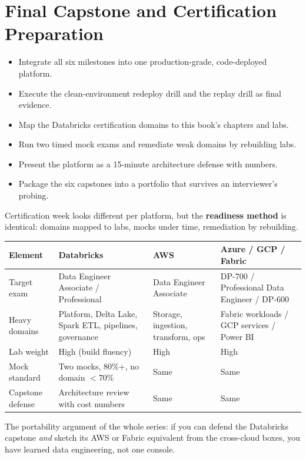 \chapter{Final Capstone and Certification Preparation}
%
%
\begin{objectives}
\begin{itemize}
    \item Integrate all six milestones into one production-grade, code-deployed platform.
    \item Execute the clean-environment redeploy drill and the replay drill as final evidence.
    \item Map the Databricks certification domains to this book's chapters and labs.
    \item Run two timed mock exams and remediate weak domains by rebuilding labs.
    \item Present the platform as a 15-minute architecture defense with numbers.
    \item Package the six capstones into a portfolio that survives an interviewer's probing.
\end{itemize}
\end{objectives}

\begin{crosscloud}
Certification week looks different per platform, but the \textbf{readiness method} is identical:
domains mapped to labs, mocks under time, remediation by rebuilding.

\vspace{2mm}
{\footnotesize
\begin{tabular}{@{}p{3.0cm}p{3.4cm}p{3.2cm}p{3.2cm}@{}}
\toprule
\textbf{Element} & \textbf{Databricks} & \textbf{AWS} & \textbf{Azure / GCP / Fabric} \\
\midrule
Target exam & Data Engineer Associate / Professional & Data Engineer Associate & DP-700 / Professional Data Engineer / DP-600 \\
Heavy domains & Platform, Delta Lake, Spark ETL, pipelines, governance & Storage, ingestion, transform, ops & Fabric workloads / GCP services / Power BI \\
Lab weight & High (build fluency) & High & High \\
Mock standard & Two mocks, 80\%+, no domain $<$70\% & Same & Same \\
Capstone defense & Architecture review with cost numbers & Same & Same \\
\bottomrule
\end{tabular}}

\vspace{1mm}
The portability argument of the whole series: if you can defend the Databricks capstone \emph{and}
sketch its AWS or Fabric equivalent from the cross-cloud boxes, you have learned data engineering,
not one console.
\end{crosscloud}


